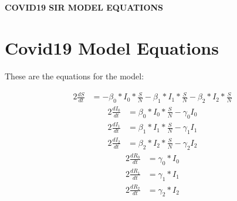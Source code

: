 \documentclass{article}%
\begin{document}
%
\normalsize%
\begin{center}%
\section*{}%
\label{sec:}%
\begin{Large}%
\textbf{COVID19 SIR MODEL EQUATIONS}%
\end{Large}

%
\end{center}%
\section{Covid19 Model Equations}%
\label{sec:Covid19ModelEquations}%
\begin{large}%
These are the equations for the model:%
\end{large}

%
\begin{alignat}{2}%
\frac{dS}{dt} &= -\beta_{0}*I_{0} * \frac{S}{N} -\beta_{1}*I_{1} * \frac{S}{N} -\beta_{2}*I_{2} * \frac{S}{N}%
\end{alignat}%
\begin{alignat}{2}%
\frac{dI_{0}}{dt} &= \beta_{0}*I_{0} * \frac{S}{N} -\gamma_{0}I_{0}%
\end{alignat}%
\begin{alignat}{2}%
\frac{dI_{1}}{dt} &= \beta_{1}*I_{1} * \frac{S}{N} -\gamma_{1}I_{1}%
\end{alignat}%
\begin{alignat}{2}%
\frac{dI_{2}}{dt} &= \beta_{2}*I_{2} * \frac{S}{N} -\gamma_{2}I_{2}%
\end{alignat}%
\begin{alignat}{2}%
\frac{dR_{0}}{dt} &= \gamma_{0}*I_{0}%
\end{alignat}%
\begin{alignat}{2}%
\frac{dR_{1}}{dt} &= \gamma_{1}*I_{1}%
\end{alignat}%
\begin{alignat}{2}%
\frac{dR_{2}}{dt} &= \gamma_{2}*I_{2}%
\end{alignat}%
\end{document}
